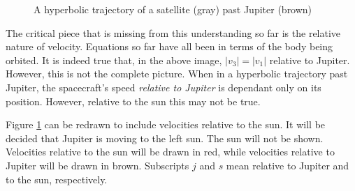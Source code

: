 \documentclass{article}
\begin{document}
\begin{figure}[H]
    \centering
    \caption{A hyperbolic trajectory of a satellite (gray) past Jupiter (brown)}\label{fig:Jupiter Flyby}
\end{figure}

The critical piece that is missing from this understanding so far is the relative nature of velocity. Equations so far have all been in terms of the body being orbited. It is indeed true that, in the above image, $|v_3|=|v_1|$ relative to Jupiter. However, this is not the complete picture. When in a hyperbolic trajectory past Jupiter, the spacecraft's speed \textit{relative to Jupiter} is dependant only on its position. However, relative to the sun this may not be true.

Figure \ref{fig:Jupiter Flyby} can be redrawn to include velocities relative to the sun. It will be decided that Jupiter is moving to the left sun. The sun will not be shown. Velocities relative to the sun will be drawn in red, while velocities relative to Jupiter will be drawn in brown. Subscripts $j$ and $s$ mean relative to Jupiter and to the sun, respectively.
\end{document}
